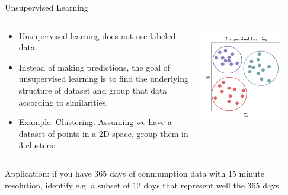 \begin{frame}[allowframebreaks]{Unsupervised Learning}
  \begin{columns}
    \begin{column}{0.5\textwidth}
  \begin{itemize}
    \item Unsupervised learning does not use labeled data. 
    \item Instead of making predictions, the goal of unsupervised learning is to find the underlying structure of dataset and group that data according to similarities.
    \item Example: Clustering. Assuming we have a dataset of points in a 2D space, group them in 3 clusters:
  \end{itemize}

\end{column}
\begin{column}{0.5\textwidth}
  \begin{center}
    \includegraphics[width=0.8\textwidth]{images/clustering.png}
  \end{center}
\end{column}
\end{columns}
Application: if you have 365 days of conmumption data with 15 minute resolution, identify e.g. a subset of 12 days that represent well the 365 days.
\end{frame}


